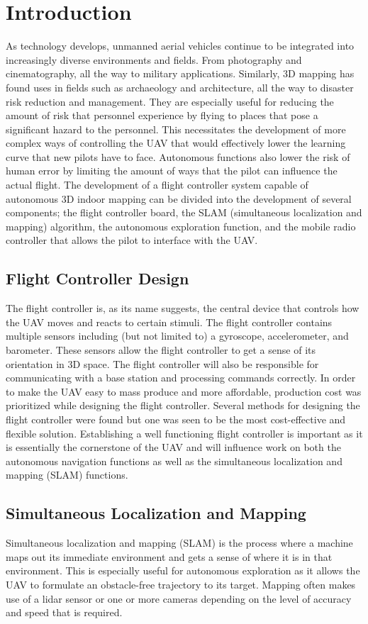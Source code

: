 \documentclass[english]{upeeei}
\begin{document}
\chapter{Introduction}
As technology develops, unmanned aerial vehicles continue to be integrated into increasingly diverse environments and
fields. From photography and cinematography, all the way to military applications. Similarly, 3D mapping has found uses
in fields such as archaeology and architecture, all the way to disaster risk reduction and management. They are especially
useful for reducing the amount of risk that personnel experience by flying to places that pose a significant hazard to 
the personnel. This necessitates the development of more complex ways of controlling the UAV that would effectively 
lower the learning curve that new pilots have to face. Autonomous functions also lower the risk of human error by 
limiting the amount of ways that the pilot can influence the actual flight. The development of a flight controller 
system capable of autonomous 3D indoor mapping can be divided into the development of several components; the flight 
controller board, the SLAM (simultaneous localization and mapping) algorithm, the autonomous exploration function, and 
the mobile radio controller that allows the pilot to interface with the UAV.
\section{Flight Controller Design}
The flight controller is, as its name suggests, the central device that controls how the UAV moves and reacts to certain
stimuli. The flight controller contains multiple sensors including (but not limited to) a gyroscope, accelerometer, and
barometer. These sensors allow the flight controller to get a sense of its orientation in 3D space. The flight controller 
will also be responsible for communicating with a base station and processing commands correctly. In order to make the
UAV easy to mass produce and more affordable, production cost was prioritized while designing the flight controller.
Several methods for designing the flight controller were found but one was seen to be the most cost-effective and
flexible solution. Establishing a well functioning flight controller is important as it is essentially the cornerstone of the
UAV and will influence work on both the autonomous navigation functions as well as the simultaneous localization and
mapping (SLAM) functions.
\section{Simultaneous Localization and Mapping}
Simultaneous localization and mapping (SLAM) is the process where a machine maps out its immediate environment and gets
a sense of where it is in that environment. This is especially useful for autonomous exploration as it allows the UAV to
formulate an obstacle-free trajectory to its target. Mapping often makes use of a lidar sensor
\cite{Dowling2018} or one or more cameras\cite{OrbSlam2} depending on the level of accuracy and speed that is required. 
\end{document}
